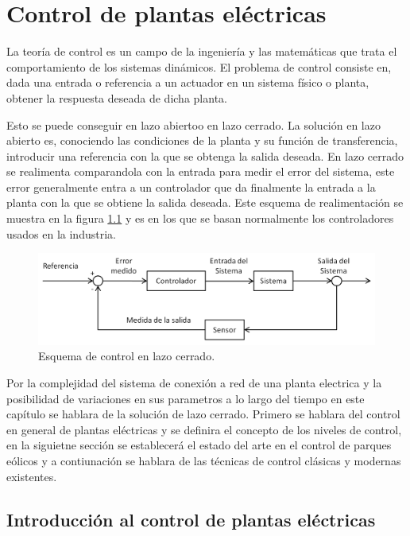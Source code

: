 \documentclass{book}
\begin{document}
\chapter{Control de plantas el\'ectricas}

La teor\'ia de control es un campo de la ingenier\'ia y las matem\'aticas que trata el comportamiento de los sistemas din\'amicos. El problema de control consiste en, dada una entrada o referencia a un actuador en un sistema f\'isico o planta, obtener la respuesta deseada de dicha planta. \par

Esto se puede conseguir en lazo abiertoo  en lazo cerrado. La solución en lazo abierto es, conociendo las condiciones de la planta y su funci\'on de transferencia, introducir una referencia con la que se obtenga la salida deseada. En lazo cerrado se realimenta comparandola con la entrada para medir el error del sistema, este error generalmente entra a un controlador que da finalmente la entrada a la planta con la que se obtiene la salida deseada. Este esquema de realimentaci\'on se muestra en la figura \ref{FeedBackLoop} y es en los que se basan normalmente los controladores usados en la industria. \par

\begin{figure}[h!]
\centering
\includegraphics[width=1\textwidth]{Realimentacion.PNG}
\caption{Esquema de control en lazo cerrado.}
\label{FeedBackLoop}
\end{figure}

Por la complejidad del sistema de conexi\'on a red de una planta electrica y la posibilidad de variaciones en sus parametros a lo largo del tiempo en este cap\'itulo se hablara de la soluci\'on de lazo cerrado. Primero se hablara del control en general de plantas el\'ectricas y se definira el concepto de los niveles de control, en la siguietne secci\'on se establecer\'a el estado del arte en el control de parques e\'olicos y a contiunaci\'on se hablara de las t\'ecnicas de control cl\'asicas y modernas existentes. \par 

	\section{Introducci\'on al control de plantas el\'ectricas}
\end{document}
